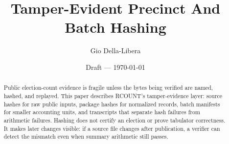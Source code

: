 \documentclass[12pt]{article}
\title{Tamper-Evident Precinct And Batch Hashing}
\author{Gio Della-Libera}
\date{Draft --- \today}
\begin{document}
\maketitle

\begin{abstract}
Public election-count evidence is fragile unless the bytes being verified are
named, hashed, and replayed. This paper describes RCOUNT's tamper-evidence
layer: source hashes for raw public inputs, package hashes for normalized
records, batch manifests for smaller accounting units, and transcripts that
separate hash failures from arithmetic failures. Hashing does not certify an
election or prove tabulator correctness. It makes later changes visible: if a
source file changes after publication, a verifier can detect the mismatch even
when summary arithmetic still passes.
\end{abstract}










\nocite{rcount-overview-2026,rcount-canvass-2026,rcount-lineage-2026,rcount-substrate-2026}


\end{document}
